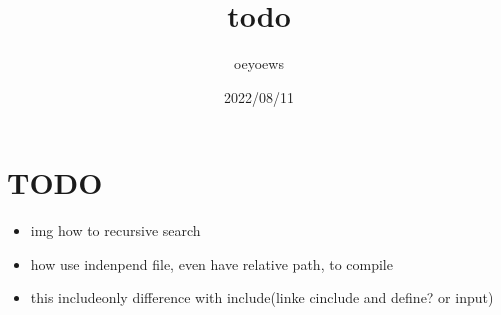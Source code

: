 \documentclass[UTF8]{article}
\title{todo \emoji{check-mark-button}}
\author{oeyoews}
\date{2022/08/11}
\begin{document}

\maketitle

\section{TODO }%
\label{sec:TODO}

\begin{itemize}
  \item img how to recursive search
  \item how use indenpend file, even have relative path, to compile
  \item this includeonly difference with include(linke cinclude and define? or
    input)
\end{itemize}
\end{document}
